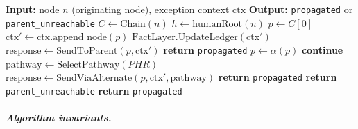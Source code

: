 \begin{algorithm}
\caption{ChainTraversal — upward exception propagation}
\label{alg:chain-traversal}
\begin{algorithmic}[1]
\State \textbf{Input:} node $n$ (originating node), exception context $\text{ctx}$
\State \textbf{Output:} \texttt{propagated} or \texttt{parent\_unreachable}
\State
\State $C \leftarrow \text{Chain}(n)$ 
\State $h \leftarrow \text{humanRoot}(n)$ 
\State $p \leftarrow C[0]$ 
\State
{}
    \State $\text{ctx}' \leftarrow \text{ctx}.\text{append\_node}(p)$ 
    \State $\text{FactLayer.UpdateLedger}(\text{ctx}')$ 
    \State $\text{response} \leftarrow \text{SendToParent}(p, \text{ctx}')$ 
    \State
        \State \textbf{return} \texttt{propagated} 
        \State $p \leftarrow \alpha(p)$ 
        \State \textbf{continue}
    \Else {}
        \State $\text{pathway} \leftarrow \text{SelectPathway}(PHR)$ 
        \State $\text{response} \leftarrow \text{SendViaAlternate}(p, \text{ctx}', \text{pathway})$
        \State {} \State \textbf{return} \texttt{propagated}
         \State \textbf{return} \texttt{parent\_unreachable}
        \EndIf
    \EndIf
\EndWhile
\State \textbf{return} \texttt{propagated} 
\end{algorithmic}
\end{algorithm}

\subparagraph{Algorithm invariants.}


